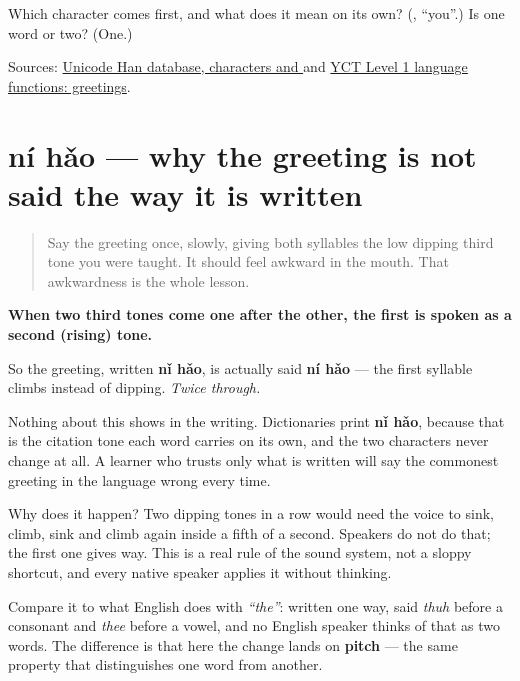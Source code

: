 \begin{tcolorbox}[breakable,colback=teal!4,colframe=teal!35!black,title={Before you move on}]
Which character comes first, and what does it mean on its own? (\textbf{}, \textquotedblleft{}you\textquotedblright{}.) Is \textbf{} one word or two? (One.)

Sources: \href{https://www.unicode.org/charts/PDF/U4E00.pdf}{Unicode Han database, characters  and } and \href{https://www.chinesetest.cn/userfiles/file/dagang/YCT1.pdf}{YCT Level 1 language functions: greetings}.
\end{tcolorbox}
\section[nǐ hǎo to ní hǎo (ní hǎo)]{ní hǎo — why the greeting is not said the way it is written}

\label{lesson:ZH-C01-tone-sandhi}



\begin{quote}
Say the greeting once, slowly, giving both syllables the low dipping third tone you were taught. It should feel awkward in the mouth. That awkwardness is the whole lesson.
\end{quote}

\begin{grammarlens}[title={Grammar Lens — one rule, and it is not optional}]
\textbf{When two third tones come one after the other, the first is spoken as a second (rising) tone.}

So the greeting, written \textbf{nǐ hǎo}, is actually said \textbf{ní hǎo} — the first syllable climbs instead of dipping. \emph{Twice through.}

Nothing about this shows in the writing. Dictionaries print \textbf{nǐ hǎo}, because that is the citation tone each word carries on its own, and the two characters never change at all. A learner who trusts only what is written will say the commonest greeting in the language wrong every time.

Why does it happen? Two dipping tones in a row would need the voice to sink, climb, sink and climb again inside a fifth of a second. Speakers do not do that; the first one gives way. This is a real rule of the sound system, not a sloppy shortcut, and every native speaker applies it without thinking.

Compare it to what English does with \emph{\textquotedblleft{}the\textquotedblright{}}: written one way, said \emph{thuh} before a consonant and \emph{thee} before a vowel, and no English speaker thinks of that as two words. The difference is that here the change lands on \textbf{pitch} — the same property that distinguishes one word from another.
\end{grammarlens}

